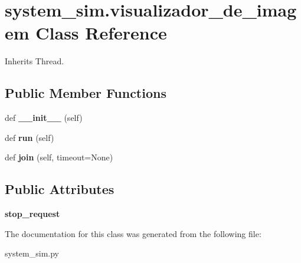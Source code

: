 \hypertarget{classsystem__sim_1_1visualizador__de__imagem}{}\section{system\+\_\+sim.\+visualizador\+\_\+de\+\_\+imagem Class Reference}
\label{classsystem__sim_1_1visualizador__de__imagem}


Inherits Thread.

\subsection*{Public Member Functions}
\begin{DoxyCompactItemize}
\item 
\mbox{\label{classsystem__sim_1_1visualizador__de__imagem_abb3ccc9d639ef21e668efdd37a0be669}} 
def {\bfseries \+\_\+\+\_\+init\+\_\+\+\_\+} (self)
\item 
\mbox{\label{classsystem__sim_1_1visualizador__de__imagem_ab48fba14f01f420f52a9e46aca16afae}} 
def {\bfseries run} (self)
\item 
\mbox{\label{classsystem__sim_1_1visualizador__de__imagem_a98d0a36fc7cab91a50e8d0a99a00b903}} 
def {\bfseries join} (self, timeout=None)
\end{DoxyCompactItemize}
\subsection*{Public Attributes}
\begin{DoxyCompactItemize}
\item 
\mbox{\label{classsystem__sim_1_1visualizador__de__imagem_a89350e3f24d4b9cde09fe031f663c36d}} 
{\bfseries stop\+\_\+request}
\end{DoxyCompactItemize}


The documentation for this class was generated from the following file\+:\begin{DoxyCompactItemize}
\item 
system\+\_\+sim.\+py\end{DoxyCompactItemize}

